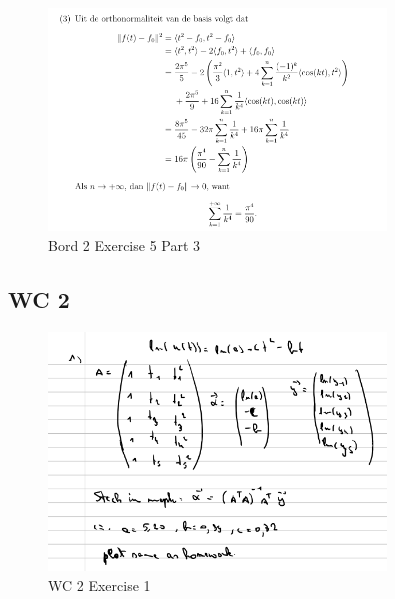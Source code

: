 \documentclass[a4paper]{article}
\begin{document}
\begin{figure}[H]
	\centering
	\includegraphics[width=0.8\textwidth]{assets/bord_2_ex_5_part_3.png}
	\caption{Bord 2 Exercise 5 Part 3}
	\label{fig:bord_2_ex_5_part_3}
\end{figure}

\subsection*{WC 2}

\begin{figure}[H]
	\centering
	\includegraphics[width=0.8\textwidth]{images/wc_2_ex_1.png}
	\caption{WC 2 Exercise 1}
	\label{fig:wc_2_ex_1}
\end{figure}
\end{document}
